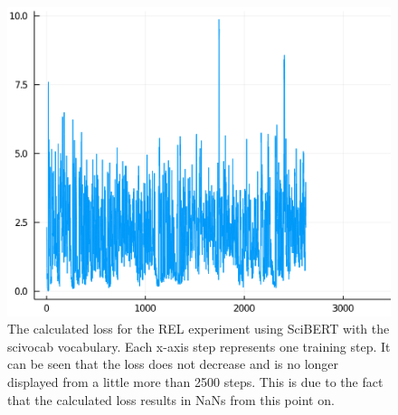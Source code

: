 \begin{figure}[h]
	\includegraphics[width=\linewidth]{src/losses}
	\caption{The calculated loss for the REL experiment using SciBERT with the scivocab vocabulary. Each x-axis step represents one training step. 
		It can be seen that the loss does not decrease and is no longer displayed from a little more than 2500 steps. This is due to the fact that the calculated loss results in NaNs from this point on.}
	\label{figure:loss}
\end{figure}

